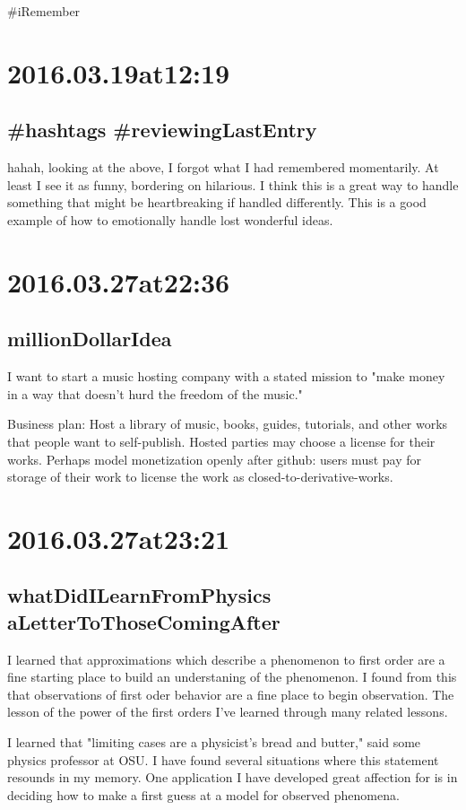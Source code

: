 \#iRemember

\section*{ 2016.03.19at12:19 }
\subsection*{ \#hashtags \#reviewingLastEntry }
hahah, looking at the above, I forgot what I had remembered momentarily. At least I see it as funny, bordering on hilarious. I think this is a great way to handle something that might be heartbreaking if handled differently. This is a good example of how to emotionally handle lost wonderful ideas. 

\section*{ 2016.03.27at22:36 }
\subsection*{ millionDollarIdea }
I want to start a music hosting company with a stated mission to "make money in a way that doesn't hurd the freedom of the music."

Business plan:
Host a library of music, books, guides, tutorials, and other works that people want to self-publish. Hosted parties may choose a license for their works. Perhaps model monetization openly after github: users must pay for storage of their work to license the work as closed-to-derivative-works. 

\section*{ 2016.03.27at23:21 }
\subsection*{ whatDidILearnFromPhysics aLetterToThoseComingAfter }
I learned that approximations which describe a phenomenon to first order are a fine starting place to build an understaning of the phenomenon. I found from this that observations of first oder behavior are a fine place to begin observation. The lesson of the power of the first orders I've learned through many related lessons.

I learned that "limiting cases are a physicist's bread and butter," said some physics professor at OSU. I have found several situations where this statement resounds in my memory. One application I have developed great affection for is in deciding how to make a first guess at a model for observed phenomena.

